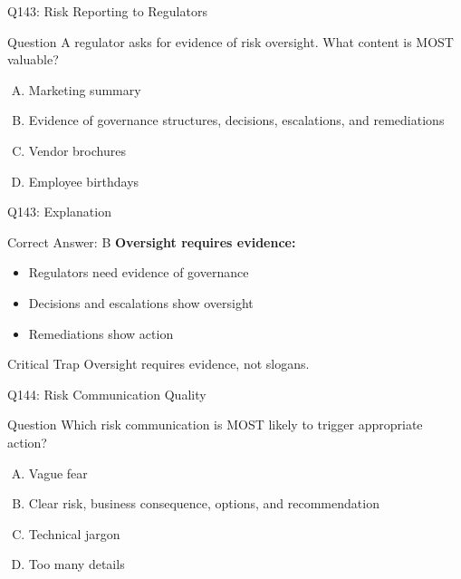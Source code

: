 \documentclass{beamer}
\begin{document}
	\begin{frame}{Q143: Risk Reporting to Regulators}
		\begin{block}{Question}
			A regulator asks for evidence of risk oversight. What content is MOST valuable?
		\end{block}
		\begin{enumerate}[(A)]
			\item Marketing summary
			\item Evidence of governance structures, decisions, escalations, and remediations
			\item Vendor brochures
			\item Employee birthdays
		\end{enumerate}
	\end{frame}
	
	\begin{frame}{Q143: Explanation}
		\begin{block}{Correct Answer: B}
			\textbf{Oversight requires evidence:}
			\begin{itemize}
				\item Regulators need evidence of governance
				\item Decisions and escalations show oversight
				\item Remediations show action
			\end{itemize}
		\end{block}
		\begin{alertblock}{Critical Trap}
			Oversight requires evidence, not slogans.
		\end{alertblock}
	\end{frame}
	
	\begin{frame}{Q144: Risk Communication Quality}
		\begin{block}{Question}
			Which risk communication is MOST likely to trigger appropriate action?
		\end{block}
		\begin{enumerate}[(A)]
			\item Vague fear
			\item Clear risk, business consequence, options, and recommendation
			\item Technical jargon
			\item Too many details
		\end{enumerate}
	\end{frame}
	
\end{document}

